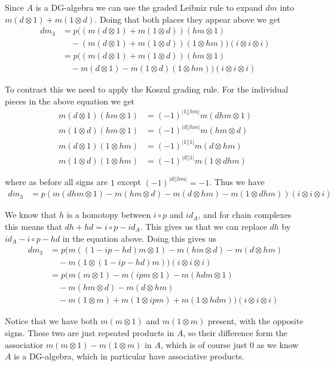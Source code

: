 Since $A$ is a DG-algebra we can use the graded Leibniz rule to expand $dm$ into $m(d\otimes 1)+m(1\otimes d)$. Doing that both places they appear above we get
\begin{align*}
    dm_3 
    &= 
    p((m(d\otimes 1)
    +m(1\otimes d))(hm\otimes 1) \\
    &\quad 
    -(m(d\otimes 1)
    +m(1\otimes d))(1\otimes hm))(i\otimes i\otimes i) \\
    &=
    p((m(d\otimes 1)
    +m(1\otimes d))(hm\otimes 1) \\
    &\quad 
    -m(d\otimes 1)
    -m(1\otimes d)(1\otimes hm))(i\otimes i\otimes i) 
\end{align*}

To contract this we need to apply the Koszul grading rule. For the individual pieces in the above equation we get
\begin{align*}
    m(d\otimes 1)(hm\otimes 1) &= (-1)^{|1||hm|}m(dhm\otimes 1) \\
    m(1\otimes d)(hm\otimes 1) &= (-1)^{|d||hm|}m(hm\otimes d) \\
    m(d\otimes 1)(1\otimes hm) &= (-1)^{|1||1|}m(d\otimes hm) \\
    m(1\otimes d)(1\otimes hm) &= (-1)^{|d||1|}m(1\otimes dhm) 
\end{align*}

where as before all signs are $1$ except $(-1)^{|d||hm|}=-1$. Thus we have 
\begin{align*}
    dm_3 
    &= 
    p(m(dhm\otimes 1)-m(hm\otimes d)-m(d\otimes hm)-m(1\otimes dhm))(i\otimes i\otimes i)
\end{align*}

We know that $h$ is a homotopy between $i\circ p$ and $id_A$, and for chain complexes this means that $dh+hd=i\circ p - id_A$. This gives us that we can replace $dh$ by $id_A-i\circ p-hd$ in the equation above. Doing this gives us 
\begin{align*}
    dm_3 
    &= 
    p(m((1-ip-hd)m\otimes 1)-m(hm\otimes d)-m(d\otimes hm) \\
    &\quad -m(1\otimes (1-ip-hd)m))(i\otimes i\otimes i) \\
    &= 
    p(m(m\otimes 1)-m(ipm\otimes 1)-m(hdm\otimes 1) \\
    &\quad -m(hm\otimes d)-m(d\otimes hm) \\
    &\quad -m(1\otimes m)+m(1\otimes ipm)+m(1\otimes hdm))(i\otimes i\otimes i)
\end{align*}

Notice that we have both $m(m\otimes 1)$ and $m(1\otimes m)$ present, with the opposite signs. These two are just repeated products in $A$, so their difference form the associatior $m(m\otimes 1)-m(1\otimes m)$ in $A$, which is of course just $0$ as we know $A$ is a DG-algebra, which in particular have associative products.

